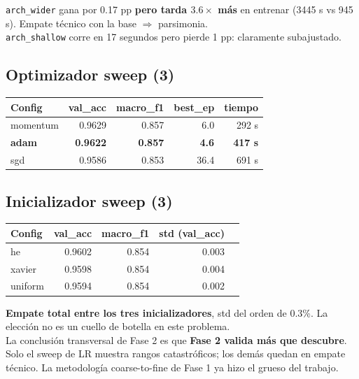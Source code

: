 \documentclass[11pt,a4paper]{article}
\newcommand{\winner}[1]{\cellcolor{accent2!15}\textbf{#1}}
\begin{document}
\begin{aprendimos}
\texttt{arch\_wider} gana por 0.17 pp \textbf{pero tarda $3.6\times$ más} en entrenar (3445 s vs 945 s). Empate técnico con la base \(\Rightarrow\) parsimonia. \\[0.2em]
\texttt{arch\_shallow} corre en 17 segundos pero pierde 1 pp: claramente subajustado.
\end{aprendimos}

\subsection{Optimizador sweep (3)}

\begin{center}
\small
\begin{tabular}{@{}lrrrr@{}}
\toprule
\textbf{Config} & \textbf{val\_acc} & \textbf{macro\_f1} & \textbf{best\_ep} & \textbf{tiempo} \\
\midrule
momentum                & 0.9629 & 0.857 & 6.0  & 292 s \\
\winner{adam}           & \winner{0.9622} & \winner{0.857} & \winner{4.6}  & \winner{417 s} \\
sgd                     & 0.9586 & 0.853 & 36.4 & 691 s \\
\bottomrule
\end{tabular}
\end{center}

\subsection{Inicializador sweep (3)}

\begin{center}
\small
\begin{tabular}{@{}lrrrr@{}}
\toprule
\textbf{Config} & \textbf{val\_acc} & \textbf{macro\_f1} & \textbf{std (val\_acc)} \\
\midrule
he         & 0.9602 & 0.854 & 0.003 \\
xavier     & 0.9598 & 0.854 & 0.004 \\
uniform    & 0.9594 & 0.854 & 0.002 \\
\bottomrule
\end{tabular}
\end{center}

\begin{aprendimos}
\textbf{Empate total entre los tres inicializadores}, std del orden de 0.3\%. La elección no es un cuello de botella en este problema. \\[0.2em]
La conclusión transversal de Fase 2 es que \textbf{Fase 2 valida más que descubre}. Solo el sweep de LR muestra rangos catastróficos; los demás quedan en empate técnico. La metodología coarse-to-fine de Fase 1 ya hizo el grueso del trabajo.
\end{aprendimos}
\end{document}
